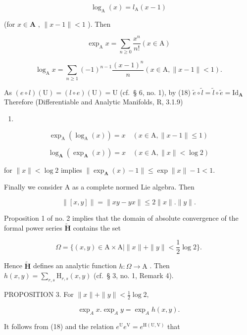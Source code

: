 \[
\log_ {\mathrm{A}} (x) = l _ {\mathrm{A}} (x - 1)
\]

(for \(x \in \mathbf{A}\) , \(\| x - 1\| < 1\) ). Then

\[
\exp_ {\mathrm{A}} x = \sum_ {n \geqslant 0} \frac {x ^ {n}}{n !} (x \in \mathrm{A})\tag{19}
\]

\[
\log_ {\mathrm{A}} x = \sum_ {n \geqslant 1} (- 1) ^ {n - 1} \frac {(x - 1) ^ {n}}{n} (x \in \mathrm{A}, \| x - 1 \| <   1).\tag{20}
\]

As \((e\circ l)(\mathrm{U}) = (l\circ e)(\mathrm{U}) = \mathrm{U}\) (cf.~§ 6, no. 1), by (18) \(\tilde{e}\circ \tilde{l} = \tilde{l}\circ \tilde{e} = \mathrm{Id}_{\mathbf{A}}\) Therefore (Differentiable and Analytic Manifolds, R, 3.1.9)

\begin{enumerate}
\def\labelenumi{(\arabic{enumi})}
\setcounter{enumi}{20}
\tightlist
\item
\end{enumerate}

\[
\exp_ {\mathrm{A}} (\log_ {\mathrm{A}} (x)) = x \quad (x \in \mathrm{A}, \| x - 1 \| \leqslant 1)\tag{21}
\]

\[
\log_ {\mathbf {A}} (\exp_ {\mathbf {A}} (x)) = x \quad (x \in \mathrm{A}, \| x \| <   \log 2)\tag{22}
\]

for \(\| x\| < \log 2\) implies \(\| \exp_{\mathbf{A}}(x) - 1\| \leqslant \exp \| x\| -1 < 1.\)

Finally we consider A as a complete normed Lie algebra. Then

\[
\| [ x, y ] \| = \| x y - y x \| \leqslant 2 \| x \|. \| y \|.
\]

Proposition 1 of no. 2 implies that the domain of absolute convergence of the formal power series \(\tilde{\mathbf{H}}\) contains the set

\[
\Omega = \{(x, y) \in \mathrm{A} \times \mathrm{A} | \| x \| + \| y \| <   \frac {1}{2} \log 2 \}.
\]

Hence \(\tilde{\mathbf{H}}\) defines an analytic function \(h\colon \Omega \to \mathrm{A}\) . Then \(h(x,y) = \sum_{r,s}\mathrm{H}_{r,s}(x,y)\) (cf.~§ 3, no. 1, Remark 4).

PROPOSITION 3. For \(\| x\| + \| y\| < \frac{1}{2}\log 2,\)

\[
\exp_ {A} x. \exp_ {A} y = \exp_ {A} h (x, y).\tag{23}
\]

It follows from (18) and the relation \(e^{\mathrm{U}}e^{\mathrm{V}} = e^{\mathrm{H}(\mathrm{U},\mathrm{V})}\) that

